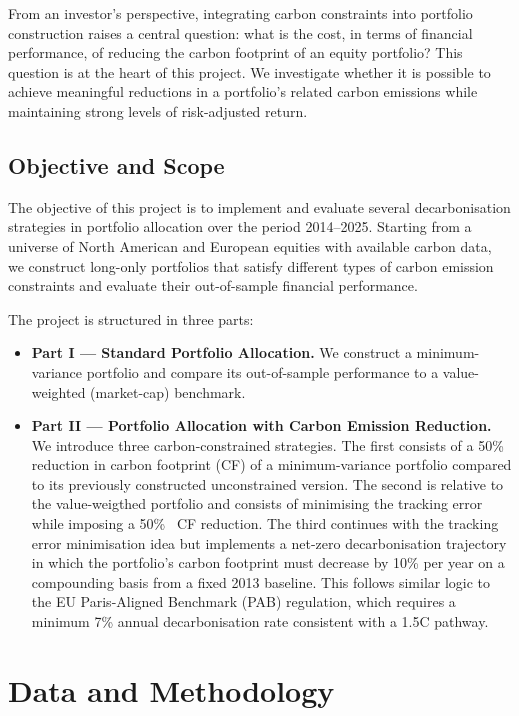 \documentclass[11pt,a4paper]{article}
\begin{document}
From an investor's perspective, integrating carbon constraints into portfolio construction raises a central question: what is the cost, in terms of financial performance, of reducing the carbon footprint of an equity portfolio? This question is at the heart of this project. We investigate whether it is possible to achieve meaningful reductions in a portfolio's related carbon emissions while maintaining strong levels of risk-adjusted return. 

\subsection{Objective and Scope}

The objective of this project is to implement and evaluate several decarbonisation strategies in portfolio allocation over the period 2014--2025. Starting from a universe of North American and European equities with available carbon data, we construct long-only portfolios that satisfy different types of carbon emission constraints and evaluate their out-of-sample financial performance.

The project is structured in three parts:

\begin{itemize}[leftmargin=*]
    \item \textbf{Part I --- Standard Portfolio Allocation.} We construct a minimum-variance portfolio and compare its out-of-sample performance to a value-weighted (market-cap) benchmark.

    \item \textbf{Part II --- Portfolio Allocation with Carbon Emission Reduction.} We introduce three carbon-constrained strategies. The first consists of a 50\% reduction in carbon footprint (CF) of a minimum-variance portfolio compared to its previously constructed unconstrained version. The second is relative to the value-weigthed portfolio and consists of minimising the tracking error while imposing a 50\% \ CF reduction. The third continues with the tracking error minimisation idea but implements a net-zero decarbonisation trajectory in which the portfolio's carbon footprint must decrease by 10\% per year on a compounding basis from a fixed 2013 baseline. This follows similar logic to the EU Paris-Aligned Benchmark (PAB) regulation, which requires a minimum 7\% annual decarbonisation rate consistent with a 1.5\textdegree C pathway.
\end{itemize}


\section{Data and Methodology}
\label{sec:data-methodology}
\end{document}
